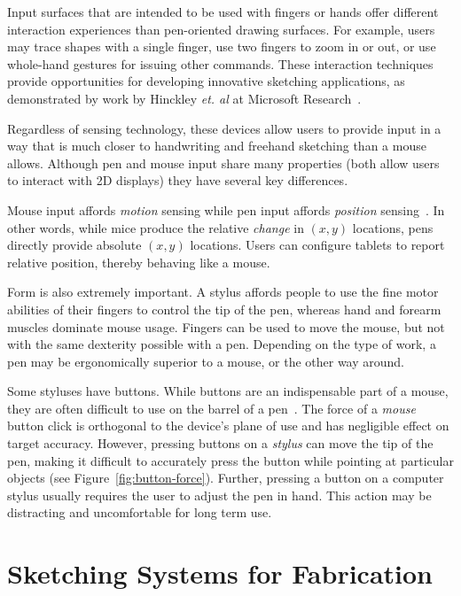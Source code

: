 Input surfaces that are intended to be used with fingers or hands
offer different interaction experiences than pen-oriented drawing
surfaces. For example, users may trace shapes with a single finger,
use two fingers to zoom in or out, or use whole-hand gestures for
issuing other commands. These interaction techniques provide
opportunities for developing innovative sketching applications, as
demonstrated by work by Hinckley \textit{et. al} at Microsoft
Research~\cite{hinckley-pen-touch}.

Regardless of sensing technology, these devices allow users to provide
input in a way that is much closer to handwriting and freehand
sketching than a mouse allows. Although pen and mouse input share many
properties (both allow users to interact with 2D displays) they have
several key differences.

Mouse input affords \textit{motion} sensing while pen input
affords \textit{position} sensing~\cite{hinckley-input-technology}. In
other words, while mice produce the relative \textit{change} in
$(x,y)$ locations, pens directly provide absolute $(x,y)$ locations.
Users can configure tablets to report relative position, thereby
behaving like a mouse.

Form is also extremely important. A stylus affords people to use the
fine motor abilities of their fingers to control the tip of the pen,
whereas hand and forearm muscles dominate mouse usage. Fingers can be
used to move the mouse, but not with the same dexterity possible with
a pen. Depending on the type of work, a pen may be ergonomically
superior to a mouse, or the other way around.



Some styluses have buttons. While buttons are an indispensable part of
a mouse, they are often difficult to use on the barrel of a
pen~\cite{plimmer-pen-usability}. The force of a \textit{mouse} button
click is orthogonal to the device's plane of use and has negligible
effect on target accuracy. However, pressing buttons on a
\textit{stylus} can move the tip of the pen, making it difficult to
accurately press the button while pointing at particular objects (see
Figure~\ref{fig:button-force}). Further, pressing a button on a
computer stylus usually requires the user to adjust the pen in
hand. This action may be distracting and uncomfortable for long term
use.

\section{Sketching Systems for Fabrication}

